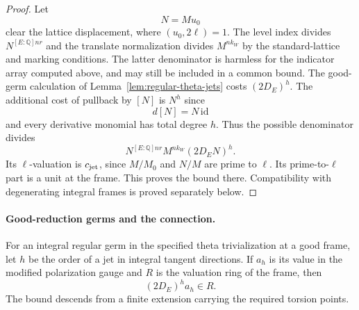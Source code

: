 \begin{proof}
Let
\[
 N=Mu_0
\]
clear the lattice displacement, where \((u_0,2\ell)=1\).
The level index divides \(N^{[E:\mathbb Q]nr}\) and the translate
normalization divides \(M^{n k_W}\) by the standard-lattice and
marking conditions. The latter denominator is harmless for the
indicator array computed above, and may still be included in a
common bound. The good-germ calculation of
Lemma~\ref{lem:regular-theta-jets} costs \((2D_E)^h\).
The additional cost of pullback by \([N]\) is \(N^h\) since
\[
 d[N]=N\,\mathrm{id}
\]
and every derivative monomial has total
degree \(h\). Thus the possible denominator divides
\[
      N^{[E:\mathbb Q]nr} M^{n k_W}(2D_E N)^h.
\]
Its \(\ell\)-valuation is \(c_{\rm jet}\), since \(M/M_0\) and
\(N/M\) are prime to \(\ell\). Its prime-to-\(\ell\) part is a
unit at the frame. This proves the bound there. Compatibility
with degenerating integral frames is proved separately below.
\end{proof}

\paragraph{Good-reduction germs and the connection.}

\begin{lemma}\label{lem:regular-theta-jets}
For an integral regular germ in the specified theta
trivialization at a good frame, let \(h\) be the order of a jet
in integral tangent directions. If \(a_h\) is its value in the modified polarization gauge and \(R\) is the valuation ring of the frame, then
\[
 (2D_E)^h a_h\in R.
\] The bound descends from a finite extension carrying
the required torsion points.
\end{lemma}

